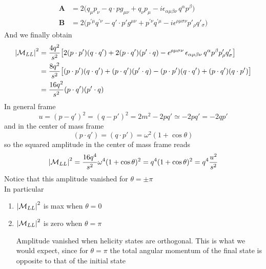 \documentclass[TheoreticalPhy_ModB.tex]{subfiles}
\begin{document}
\begin{align*}
\textbf{A}	& = 2 \bigl( q_{\mu}p_{\nu} - q \cdot p g_{\mu\nu} + q_{\nu}p_{\mu} - i \epsilon_{\alpha\mu\beta\nu} \, q^{\alpha}p^{\beta} \bigr) \\
\textbf{B}	& = 2 \bigl( p^{\prime \mu} q^{\prime \nu} - q' \cdot p' g^{\mu\nu} + p^{\prime \nu} q^{\prime \mu} 
	- i \epsilon^{\rho\mu\sigma\nu} p'_{\rho} q'_{\sigma} \bigr)
\end{align*}
And we finally obtain
\begin{align*}
\abs{\mathM_{LL}}^2 
	& = \frac{4q^2}{s^2} \bigl[ 2(p \cdot p')(q \cdot q') + 2(p \cdot q')(p' \cdot q) - \epsilon^{\rho\mu\sigma\nu} \, \epsilon_{\alpha\mu\beta\nu} \,
		q^{\alpha} p^{\beta} p'_{\rho} q'_{\sigma} \bigr] \\
	& = \frac{8q^2}{s^2} \bigl[ (p \cdot p') (q \cdot q') + (p \cdot q')(p' \cdot q) - (p \cdot p')(q \cdot q') + (p \cdot q')(q \cdot p') \bigr] \\
	& =  \frac{16q^2}{s^2} (p \cdot q')(p' \cdot q)
\end{align*}
In general frame
\[
u = (p - q')^2 = (q - p')^2 = 2m^2 - 2pq' \simeq -2pq' = -2qp'
\]
and in the center of mass frame
\[
(p \cdot q') = (q \cdot p') = \omega^2(1 + \cos \theta)
\]
so the squared amplitude in the center of mass frame reads
\[
\abs{\mathcal{M}_{LL}}^2 = \frac{16q^4}{s^2} \omega^4 (1 + \cos \theta)^2 = q^4(1 + \cos \theta)^2 = q^4 \frac{u^2}{s^2}
\]
Notice that this amplitude vanished for $\theta = \pm \pi$\\
In particular
\begin{enumerate}
\item $\abs{\mathcal{M}_{LL}}^2$ is max when $\theta = 0$

\begin{center}

\end{center}

\item $\abs{\mathcal{M}_{LL}}^2$ is zero when $\theta = \pi$

\begin{center}

\end{center}

Amplitude vanished when helicity states are orthogonal. This  is what we would expect, since for $\theta = \pi$ the total angular momentum of the final state is opposite to that of the initial state 
\end{enumerate}
\end{document}
